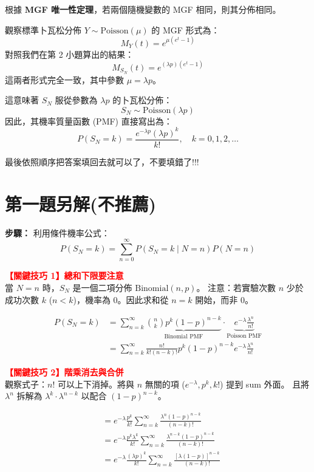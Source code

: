 \documentclass{article}
\begin{document}
根據 \textbf{MGF 唯一性定理}，若兩個隨機變數的 MGF 相同，則其分佈相同。

\noindent
觀察標準卜瓦松分佈 $Y \sim \text{Poisson}(\mu)$ 的 MGF 形式為：
$$ M_Y(t) = e^{\mu(e^t - 1)} $$
對照我們在第 2 小題算出的結果：
$$ M_{S_N}(t) = e^{(\lambda p)(e^t - 1)} $$
這兩者形式完全一致，其中參數 $\mu = \lambda p$。

\noindent
這意味著 $S_N$ 服從參數為 $\lambda p$ 的卜瓦松分佈：
$$ S_N \sim \text{Poisson}(\lambda p) $$
因此，其機率質量函數 (PMF) 直接寫出為：
$$ P(S_N = k) = \frac{e^{-\lambda p} (\lambda p)^k}{k!}, \quad k = 0, 1, 2, \dots $$


\noindent
最後依照順序把答案填回去就可以了，不要填錯了!!!

\section*{第一題另解(不推薦)}
\noindent
\textbf{步驟：}
利用條件機率公式：
$$ P(S_N=k) = \sum_{n=0}^\infty P(S_N=k \mid N=n) P(N=n) $$

\noindent
\textbf{\textcolor{red}{【關鍵技巧 1】總和下限要注意}} \\
當 $N=n$ 時，$S_N$ 是一個二項分佈 $\text{Binomial}(n, p)$。
注意：若實驗次數 $n$ 少於成功次數 $k$ ($n < k$)，機率為 0。因此求和從 $n=k$ 開始，而非 0。

\begin{align*}
P(S_N=k)
&= \sum_{n=k}^\infty \underbrace{\binom{n}{k} p^k(1-p)^{n-k}}_{\text{Binomial PMF}} \cdot \underbrace{e^{-\lambda}\frac{\lambda^n}{n!}}_{\text{Poisson PMF}} \\
&= \sum_{n=k}^\infty \frac{n!}{k!(n-k)!} p^k(1-p)^{n-k} e^{-\lambda}\frac{\lambda^n}{n!}
\end{align*}

\noindent
\textbf{\textcolor{red}{【關鍵技巧 2】階乘消去與合併}} \\
觀察式子：$n!$ 可以上下消掉。將與 $n$ 無關的項 ($e^{-\lambda}, p^k, k!$) 提到 sum 外面。
且將 $\lambda^n$ 拆解為 $\lambda^k \cdot \lambda^{n-k}$ 以配合 $(1-p)^{n-k}$。

\begin{align*}
&= e^{-\lambda} \frac{p^k}{k!} \sum_{n=k}^\infty \frac{\lambda^n (1-p)^{n-k}}{(n-k)!} \\
&= e^{-\lambda} \frac{p^k \lambda^k}{k!} \sum_{n=k}^\infty \frac{\lambda^{n-k} (1-p)^{n-k}}{(n-k)!} \\
&= e^{-\lambda} \frac{(\lambda p)^k}{k!} \sum_{n=k}^\infty \frac{[\lambda(1-p)]^{n-k}}{(n-k)!}
\end{align*}
\end{document}
